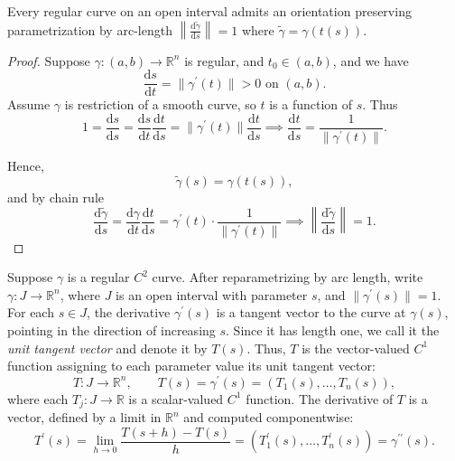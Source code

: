 \begin{proposition}
    Every regular curve on an open interval admits an orientation preserving parametrization by arc-length \(\left\lVert \frac{\mathrm{d} \widetilde{\gamma} }{\mathrm{d} s}  \right\rVert = 1 \) where \(\widetilde{\gamma} = \gamma (t(s))\).  
\end{proposition}

\begin{proof}
    Suppose \(\gamma : (a, b) \to \mathbb{R} ^n\) is regular, and \(t_0 \in (a, b)\), and we have 
    \[
        \frac{\mathrm{d}s}{\mathrm{d}t} = \lVert \gamma ^{\prime} (t) \rVert > 0 \text{ on } (a, b). 
    \]
    Assume \(\gamma \) is restriction of a smooth curve, so \(t\) is a function of \(s\). Thus
    \[
        1 = \frac{\mathrm{d}s}{\mathrm{d}s} = \frac{\mathrm{d}s}{\mathrm{d}t} \frac{\mathrm{d}t}{\mathrm{d}s} = \lVert \gamma ^{\prime} (t) \rVert \frac{\mathrm{d}t}{\mathrm{d}s} \implies \frac{\mathrm{d} t}{\mathrm{d} s} = \frac{1}{\lVert \gamma ^{\prime} (t) \rVert }.  
    \]

    Hence, 
    \[
        \widetilde{\gamma} (s) = \gamma (t(s)),
    \]
    and by chain rule
    \[
        \frac{\mathrm{d} \widetilde{\gamma} }{\mathrm{d}s} = \frac{\mathrm{d} \gamma }{\mathrm{d} t} \frac{\mathrm{d}t}{\mathrm{d}s} = \gamma ^{\prime} (t) \cdot \frac{1}{\lVert \gamma ^{\prime} (t) \rVert } \implies \left\lVert \frac{\mathrm{d} \widetilde{\gamma} }{\mathrm{d}s}  \right\rVert = 1.   
    \]
\end{proof}

Suppose \(\gamma\) is a regular \(C^2\) curve. After reparametrizing by arc length, write \(\gamma : J \to \mathbb{R}^n\), where \(J\) is an open interval with parameter \(s\), and \(\lVert \gamma^{\prime}(s) \rVert = 1\). For each \(s \in J\), the derivative \(\gamma^{\prime}(s)\) is a tangent vector to the curve at \(\gamma(s)\), pointing in the direction of increasing \(s\). Since it has length one, we call it the \emph{unit tangent vector} and denote it by \(T(s)\). Thus, \(T\) is the vector-valued \(C^1\) function assigning to each parameter value its unit tangent vector:
\[
    T : J \to \mathbb{R}^n, \qquad
    T(s) = \gamma^{\prime}(s) = (T_1(s), \dots, T_n(s)),
\]
where each \(T_j : J \to \mathbb{R}\) is a scalar-valued \(C^1\) function. The derivative of \(T\) is a vector, defined by a limit in \(\mathbb{R}^n\) and computed componentwise:
\[
    T^{\prime}(s)
    = \lim_{h \to 0} \frac{T(s+h)-T(s)}{h}
    = (T_1^{\prime}(s), \dots, T_n^{\prime}(s))
    = \gamma^{\prime\prime}(s).
\]

